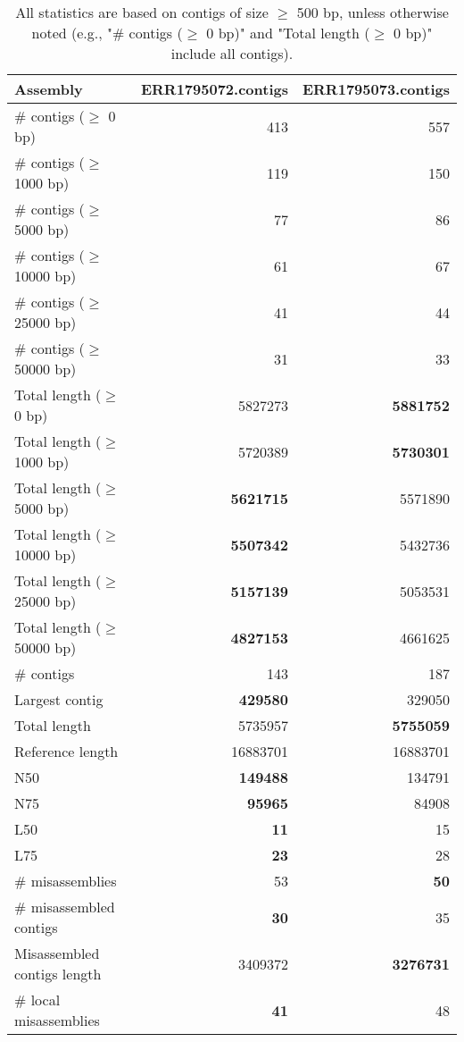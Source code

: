 \documentclass[12pt,a4paper]{article}
\begin{document}
\begin{table}[ht]
\begin{center}
\caption{All statistics are based on contigs of size $\geq$ 500 bp, unless otherwise noted (e.g., "\# contigs ($\geq$ 0 bp)" and "Total length ($\geq$ 0 bp)" include all contigs).}
\begin{tabular}{|l*{2}{|r}|}
\hline
Assembly & ERR1795072.contigs & ERR1795073.contigs \\ \hline
\# contigs ($\geq$ 0 bp) & 413 & 557 \\ \hline
\# contigs ($\geq$ 1000 bp) & 119 & 150 \\ \hline
\# contigs ($\geq$ 5000 bp) & 77 & 86 \\ \hline
\# contigs ($\geq$ 10000 bp) & 61 & 67 \\ \hline
\# contigs ($\geq$ 25000 bp) & 41 & 44 \\ \hline
\# contigs ($\geq$ 50000 bp) & 31 & 33 \\ \hline
Total length ($\geq$ 0 bp) & 5827273 & {\bf 5881752} \\ \hline
Total length ($\geq$ 1000 bp) & 5720389 & {\bf 5730301} \\ \hline
Total length ($\geq$ 5000 bp) & {\bf 5621715} & 5571890 \\ \hline
Total length ($\geq$ 10000 bp) & {\bf 5507342} & 5432736 \\ \hline
Total length ($\geq$ 25000 bp) & {\bf 5157139} & 5053531 \\ \hline
Total length ($\geq$ 50000 bp) & {\bf 4827153} & 4661625 \\ \hline
\# contigs & 143 & 187 \\ \hline
Largest contig & {\bf 429580} & 329050 \\ \hline
Total length & 5735957 & {\bf 5755059} \\ \hline
Reference length & 16883701 & 16883701 \\ \hline
N50 & {\bf 149488} & 134791 \\ \hline
N75 & {\bf 95965} & 84908 \\ \hline
L50 & {\bf 11} & 15 \\ \hline
L75 & {\bf 23} & 28 \\ \hline
\# misassemblies & 53 & {\bf 50} \\ \hline
\# misassembled contigs & {\bf 30} & 35 \\ \hline
Misassembled contigs length & 3409372 & {\bf 3276731} \\ \hline
\# local misassemblies & {\bf 41} & 48 \\ \hline

\end{tabular}
\end{center}
\end{table}
\end{document}
